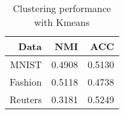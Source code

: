 \begin{table}[ht]
\centering
\caption{Clustering performance with Kmeans}\label{tab:kmeans-raw}
\begin{tabular}{ | r | r | r |}
\hline
Data & NMI & ACC  \\ \hline 
MNIST & 0.4908 & 0.5130 \\ \hline 
Fashion & 0.5118 & 0.4738 \\ \hline 
Reuters & 0.3181 & 0.5249 \\ 
\hline
\end{tabular}
\end{table}
